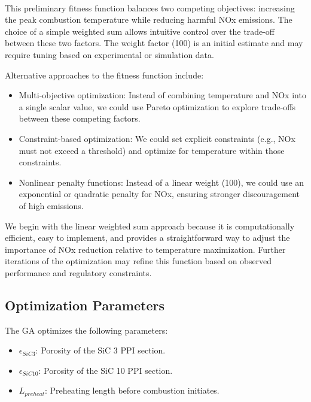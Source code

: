 \documentclass[12pt]{report}
\begin{document}
\\

This preliminary fitness function balances two competing objectives: increasing the peak combustion temperature while reducing harmful NOx emissions. The choice of a simple weighted sum allows intuitive control over the trade-off between these two factors. The weight factor (100) is an initial estimate and may require tuning based on experimental or simulation data.

Alternative approaches to the fitness function include:
\begin{itemize}
\item Multi-objective optimization: Instead of combining temperature and NOx into a single scalar value, we could use Pareto optimization to explore trade-offs between these competing factors.
\item Constraint-based optimization: We could set explicit constraints (e.g., NOx must not exceed a threshold) and optimize for temperature within those constraints.
\item Nonlinear penalty functions: Instead of a linear weight (100), we could use an exponential or quadratic penalty for NOx, ensuring stronger discouragement of high emissions.
\end{itemize}

We begin with the linear weighted sum approach because it is computationally efficient, easy to implement, and provides a straightforward way to adjust the importance of NOx reduction relative to temperature maximization. Further iterations of the optimization may refine this function based on observed performance and regulatory constraints.

\subsection{Optimization Parameters}
The GA optimizes the following parameters:
\begin{itemize}
    \item $\epsilon_{SiC3}$: Porosity of the SiC 3 PPI section.
    \item $\epsilon_{SiC10}$: Porosity of the SiC 10 PPI section.
    \item $L_{preheat}$: Preheating length before combustion initiates.
\end{itemize}
\end{document}
